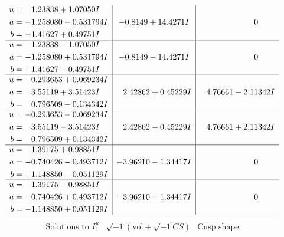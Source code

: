 \documentclass[1p]{elsarticle_modified}
\theoremstyle{definition}
\newcommand{\I}{\sqrt{-1}}
\begin{document}
$$\begin{array}{c|c|c}
\begin{aligned}
u &= \phantom{-}1.23838 + 1.07050 I \\
a &= -1.258080 - 0.531794 I \\
b &= -1.41627 + 0.49751 I\end{aligned}
 & -0.8149 + 14.4271 I & \phantom{-0.000000 } 0 \\ \hline\begin{aligned}
u &= \phantom{-}1.23838 - 1.07050 I \\
a &= -1.258080 + 0.531794 I \\
b &= -1.41627 - 0.49751 I\end{aligned}
 & -0.8149 - 14.4271 I & \phantom{-0.000000 } 0 \\ \hline\begin{aligned}
u &= -0.293653 + 0.069234 I \\
a &= \phantom{-}3.55119 + 3.51423 I \\
b &= \phantom{-}0.796509 - 0.134342 I\end{aligned}
 & \phantom{-}2.42862 + 0.45229 I & \phantom{-}4.76661 - 2.11342 I \\ \hline\begin{aligned}
u &= -0.293653 - 0.069234 I \\
a &= \phantom{-}3.55119 - 3.51423 I \\
b &= \phantom{-}0.796509 + 0.134342 I\end{aligned}
 & \phantom{-}2.42862 - 0.45229 I & \phantom{-}4.76661 + 2.11342 I \\ \hline\begin{aligned}
u &= \phantom{-}1.39175 + 0.98851 I \\
a &= -0.740426 - 0.493712 I \\
b &= -1.148850 - 0.051129 I\end{aligned}
 & -3.96210 - 1.34417 I & \phantom{-0.000000 } 0 \\ \hline\begin{aligned}
u &= \phantom{-}1.39175 - 0.98851 I \\
a &= -0.740426 + 0.493712 I \\
b &= -1.148850 + 0.051129 I\end{aligned}
 & -3.96210 + 1.34417 I & \phantom{-0.000000 } 0\\
 \hline 
 \end{array}$$\newpage$$\begin{array}{c|c|c}  
\text{Solutions to }I^u_{1}& \I (\text{vol} + \sqrt{-1}CS) & \text{Cusp shape}\\
 \hline 
\begin{aligned}

\end{aligned}
\end{array}$$
\end{document}

